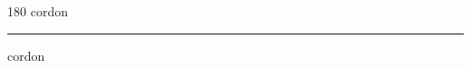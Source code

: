 
\begin{frame}
\begin{center}
\begin{turn}{180}
{\fontsize{2.5cm}{1em}\selectfont cordon}
\end{turn}
\vspace{1em}\par  
\hrule
\vspace{1em}\par  
{\fontsize{2.5cm}{1em}\selectfont cordon}
\end{center}
\end{frame}
